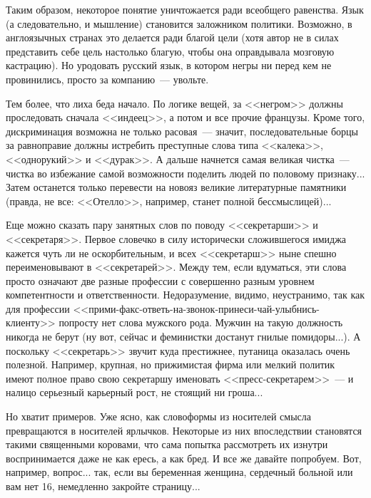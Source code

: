 \documentclass{scrbook}
\newcommand{\flqq}{<<}
\newcommand{\frqq}{>>}
\newcommand{\mdash}{~--- }
\begin{document}
Таким образом, некоторое понятие уничтожается ради всеобщего равенства. Язык (а следовательно, и мышление) становится заложником политики. Возможно, в англоязычных странах это делается ради благой цели (хотя автор не в силах представить себе цель настолько благую, чтобы она оправдывала мозговую кастрацию). Но уродовать русский язык, в котором негры ни перед кем не провинились, просто за компанию{\mdash}увольте.

Тем более, что лиха беда начало. По логике вещей, за {\flqq}негром{\frqq} должны проследовать сначала {\flqq}индеец{\frqq}, а потом и все прочие французы. Кроме того, дискриминация возможна не только расовая{\mdash}значит, последовательные борцы за равноправие должны истребить преступные слова типа {\flqq}калека{\frqq}, {\flqq}однорукий{\frqq} и {\flqq}дурак{\frqq}. А дальше начнется самая великая чистка{\mdash}чистка во избежание самой возможности поделить людей по половому признаку... Затем останется только перевести на новояз великие литературные памятники (правда, не все: {\flqq}Отелло{\frqq}, например, станет полной бессмыслицей)...

Еще можно сказать пару занятных слов по поводу {\flqq}секретарши{\frqq} и {\flqq}секретаря{\frqq}. Первое словечко в силу исторически сложившегося имиджа кажется чуть ли не оскорбительным, и всех {\flqq}секретарш{\frqq} ныне спешно переименовывают в {\flqq}секретарей{\frqq}. Между тем, если вдуматься, эти слова просто означают две разные профессии с совершенно разным уровнем компетентности и ответственности. Недоразумение, видимо, неустранимо, так как для профессии {\flqq}прими-факс-ответь-на-звонок-принеси-чай-улыбнись-клиенту{\frqq} попросту нет слова мужского рода. Мужчин на такую должность никогда не берут (ну вот, сейчас и феминистки достанут гнилые помидоры...). А поскольку {\flqq}секретарь{\frqq} звучит куда престижнее, путаница оказалась очень полезной. Например, крупная, но прижимистая фирма или мелкий политик имеют полное право свою секретаршу именовать {\flqq}пресс-секретарем{\frqq}{\mdash}и налицо серьезный карьерный рост, не стоящий ни гроша...

Но хватит примеров. Уже ясно, как словоформы из носителей смысла превращаются в носителей ярлычков. Некоторые из них впоследствии становятся такими священными коровами, что сама попытка рассмотреть их изнутри воспринимается даже не как ересь, а как бред. И все же давайте попробуем. Вот, например, вопрос... так, если вы беременная женщина, сердечный больной или вам нет 16, немедленно закройте страницу...
\end{document}
